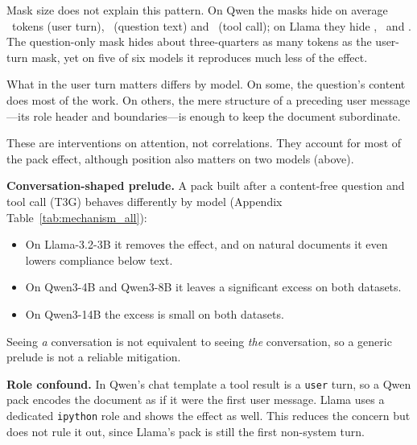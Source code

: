 \documentclass[10pt]{article}
\newcommand{\cond}[1]{\textsf{#1}}
\begin{document}
Mask size does not explain this pattern. On Qwen the masks hide on average \SpanUserQwen\ tokens (user turn), \SpanQQwen\ (question
text) and \SpanCallQwen\ (tool call); on Llama they hide \SpanUserLlama, \SpanQLlama\ and \SpanCallLlama. The
question-only mask hides about three-quarters as many tokens as the user-turn mask, yet on five of six models it reproduces much less
of the effect.

What in the user turn matters differs by model. On some, the question's content does most of the work. On others, the mere
structure of a preceding user message---its role header and boundaries---is enough to keep the document subordinate.

These are interventions on attention, not correlations. They account for most of the pack effect, although position also matters
on two models (above).

\textbf{Conversation-shaped prelude.} A pack built after a content-free question and tool call (\cond{T3G}) behaves differently by
model (Appendix Table~\ref{tab:mechanism_all}):
\begin{itemize}
\item On Llama-3.2-3B it removes the effect, and on natural documents it even lowers compliance below text.
\item On Qwen3-4B and Qwen3-8B it leaves a significant excess on both datasets.
\item On Qwen3-14B the excess is small on both datasets.
\end{itemize}
Seeing \emph{a} conversation is not equivalent to seeing \emph{the} conversation, so a generic prelude is not a reliable mitigation.

\textbf{Role confound.} In Qwen's chat template a tool result is a \texttt{user} turn, so a Qwen pack encodes the document as if it
were the first user message. Llama uses a dedicated \texttt{ipython} role and shows the effect as well. This reduces the concern but
does not rule it out, since Llama's pack is still the first non-system turn.
\end{document}
